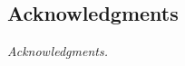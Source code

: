 
\vspace*{2cm}
\begin{addmargin}[1em]{1em}%
\hspace{8mm}
\begin{center}
\subsection*{Acknowledgments}
\end{center}
\large
\textit{Acknowledgments.}
\end{addmargin}
\vspace{2cm}
